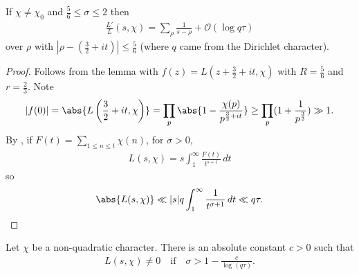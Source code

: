 \documentclass{article}
\newcommand{\1}{\mathbbm{1}}
\newcommand{\bigO}{\mathcal{O}}
\begin{document}
\begin{nlemma}\label{lem:1}
  If $\chi \neq \chi_0$ and $\frac{5}{6} \leq \sigma \leq 2$ then
  \begin{align*}
    \frac{L'}{L}(s,\chi) = \sum_\rho \frac{1}{s-\rho} + \bigO(\log q \tau)
  \end{align*}
  over $\rho$ with $|\rho - (\frac{3}{2}+it)| \leq \frac 56$
  (where $q$ came from the Dirichlet character).
\end{nlemma}
\begin{proof}
  Follows from the lemma with $f(z) = L(z + \frac{3}{2} + it, \chi)$ with $R = \frac{5}{6}$ and $r = \frac{2}{3}$.
  Note
  \begin{align*}
    |f(0)| = \abs{L\left(\frac{3}{2} +it,\chi\right)} = \prod_p \abs{1 - \frac{\chi(p)}{p^{\frac 32 + it}}} \geq \prod_p (1 + \frac{1}{p^{\frac 32}}) \gg 1.
  \end{align*}
  By , if $F(t) = \sum_{1 \leq n \leq t} \chi(n)$, for $\sigma > 0$,
  \begin{align*}
    L(s,\chi) = s \int_1^\infty \frac{F(t)}{t^{s+1}}\,dt
  \end{align*}
  so
  \begin{equation*}
    \abs{L(s,\chi)} \ll |s| q \int_1^\infty \frac{1}{t^{\sigma+1}}\,dt \ll q\tau.\qedhere
  \end{equation*}
\end{proof}
\begin{thm}
  Let $\chi$ be a non-quadratic character.
  There is an absolute constant $c > 0$ such that
  \begin{align*}
    L(s,\chi) \neq 0 \quad \text{if} \quad \sigma > 1 - \frac{c}{\log(q \tau)}.
  \end{align*}
\end{thm}
\end{document}

